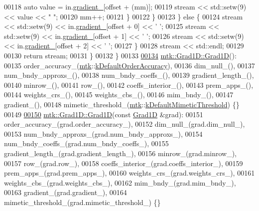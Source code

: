 \begin{DoxyCode}
00118         \textcolor{keyword}{auto} value = in.\hyperlink{classmtk_1_1Grad1D_a024b84b1ea285c0c590eb42d40ff4469}{gradient\_}[offset + (mm)];
00119         stream << std::setw(9) << value << \textcolor{stringliteral}{" "};
00120         mm++;
00121       \}
00122     \}
00123   \} \textcolor{keywordflow}{else} \{
00124     stream << std::setw(9) << in.\hyperlink{classmtk_1_1Grad1D_a024b84b1ea285c0c590eb42d40ff4469}{gradient\_}[offset + 0] << \textcolor{charliteral}{' '};
00125     stream << std::setw(9) << in.\hyperlink{classmtk_1_1Grad1D_a024b84b1ea285c0c590eb42d40ff4469}{gradient\_}[offset + 1] << \textcolor{charliteral}{' '};
00126     stream << std::setw(9) << in.\hyperlink{classmtk_1_1Grad1D_a024b84b1ea285c0c590eb42d40ff4469}{gradient\_}[offset + 2] << \textcolor{charliteral}{' '};
00127   \}
00128   stream << std::endl;
00129 
00130   \textcolor{keywordflow}{return} stream;
00131 \}
00132 \}
00133 
\hypertarget{mtk__grad__1d_8cc_source_l00134}{}\hyperlink{classmtk_1_1Grad1D_ae21e6ac2652e653c48f15b304ee83a75}{00134} \hyperlink{classmtk_1_1Grad1D_ae21e6ac2652e653c48f15b304ee83a75}{mtk::Grad1D::Grad1D}():
00135   order\_accuracy\_(\hyperlink{namespacemtk}{mtk}::\hyperlink{group__c01-roots_ga0d95560098eb36420511103637b6952f}{kDefaultOrderAccuracy}),
00136   dim\_null\_(),
00137   num\_bndy\_approxs\_(),
00138   num\_bndy\_coeffs\_(),
00139   gradient\_length\_(),
00140   minrow\_(),
00141   row\_(),
00142   coeffs\_interior\_(),
00143   prem\_apps\_(),
00144   weights\_crs\_(),
00145   weights\_cbs\_(),
00146   mim\_bndy\_(),
00147   gradient\_(),
00148   mimetic\_threshold\_(\hyperlink{namespacemtk}{mtk}::\hyperlink{group__c01-roots_ga35718d949bdc81a08a9cc8ebbe3478a2}{kDefaultMimeticThreshold}) \{\}
00149 
\hypertarget{mtk__grad__1d_8cc_source_l00150}{}\hyperlink{classmtk_1_1Grad1D_a5708bcb61bde3f7f3a4ddede191d82a4}{00150} \hyperlink{classmtk_1_1Grad1D_ae21e6ac2652e653c48f15b304ee83a75}{mtk::Grad1D::Grad1D}(\textcolor{keyword}{const} \hyperlink{classmtk_1_1Grad1D}{Grad1D} &grad):
00151   order\_accuracy\_(grad.order\_accuracy\_),
00152   dim\_null\_(grad.dim\_null\_),
00153   num\_bndy\_approxs\_(grad.num\_bndy\_approxs\_),
00154   num\_bndy\_coeffs\_(grad.num\_bndy\_coeffs\_),
00155   gradient\_length\_(grad.gradient\_length\_),
00156   minrow\_(grad.minrow\_),
00157   row\_(grad.row\_),
00158   coeffs\_interior\_(grad.coeffs\_interior\_),
00159   prem\_apps\_(grad.prem\_apps\_),
00160   weights\_crs\_(grad.weights\_crs\_),
00161   weights\_cbs\_(grad.weights\_cbs\_),
00162   mim\_bndy\_(grad.mim\_bndy\_),
00163   gradient\_(grad.gradient\_),
00164   mimetic\_threshold\_(grad.mimetic\_threshold\_) \{\}

\end{DoxyCode}
